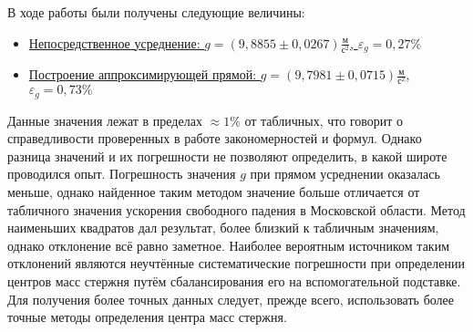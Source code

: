 \documentclass[a4paper,12pt]{article} %
\begin{document}
В ходе работы были получены следующие величины:
\begin{itemize}
	\item \underline{Непосредственное усреднение: $ g = \left( 9,8855\pm0,0267\right) \frac{\text{м}}{\text{с}^2} $, $ \varepsilon_g=0,27\% $}
	\item \underline{Построение аппроксимирующей прямой: $ g = \left( 9,7981\pm0,0715\right) \frac{\text{м}}{\text{с}^2} $, $ \varepsilon_g=0,73\% $}
\end{itemize}
Данные значения лежат в пределах $ \approx 1\% $ от табличных, что говорит о справедливости проверенных в работе закономерностей и формул. Однако разница значений и их погрешности не позволяют определить, в какой широте проводился опыт. Погрешность значения $ g $ при прямом усреднении оказалась меньше, однако найденное таким методом значение больше отличается от табличного значения ускорения свободного падения в Московской области. Метод наименьших квадратов дал результат, более близкий к табличным значениям, однако отклонение всё равно заметное. Наиболее вероятным источником таким отклонений являются неучтённые систематические погрешности при определении центров масс стержня путём сбалансирования его на вспомогательной подставке. Для получения более точных данных следует, прежде всего, использовать более точные методы определения центра масс стержня.
\end{document}
